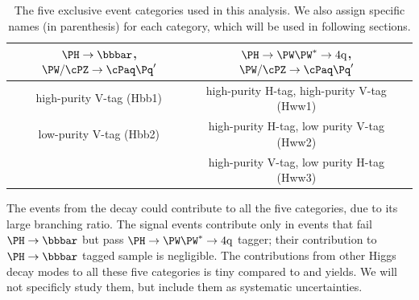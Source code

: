 \begin{table}[htb]
\begin{center}
  \caption{
    The five exclusive event categories used in this analysis.
    We also assign specific names (in parenthesis) for each category, which will be 
    used in following sections.   
    \label{table:categories}}
\begin{tabular}{ ccc}
\hline
$\Hbb$, $\Vqq$ & $\Hww$, $\Vqq$  \\
\hline
high-purity V-tag (Hbb1)  &  high-purity H-tag, high-purity V-tag (Hww1)  \\
low-purity  V-tag (Hbb2) &  high-purity H-tag, low purity V-tag (Hww2) \\
                           &  high-purity V-tag, low purity H-tag (Hww3) \\
\hline
\end{tabular}
\end{center}
\end{table}

The events from the \HbbVqq decay could contribute to all the five
categories, due to its large branching ratio.
The \HwwVqq signal events contribute only in events that fail
$\Hbb$ but pass $\Hww$ tagger; their contribution to
$\Hbb$ tagged sample is negligible.
The contributions from other Higgs decay modes to all these five categories
is tiny compared to \HbbVqq and \HwwVqq yields.  
We will not specificly study them, but include them as
 systematic uncertainties.







